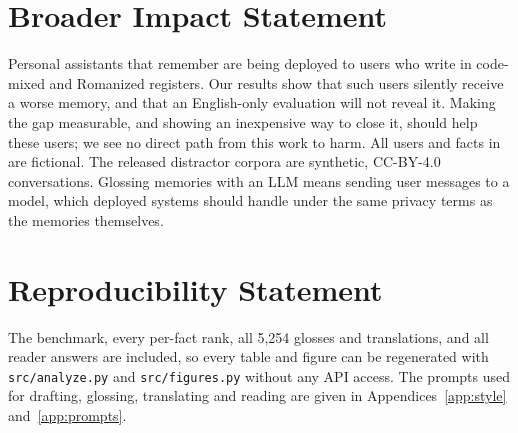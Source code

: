 \section*{Broader Impact Statement}
Personal assistants that remember are being deployed to users who write in code-mixed and Romanized registers. Our results show that such users silently receive a worse memory, and that an English-only evaluation will not reveal it. Making the gap measurable, and showing an inexpensive way to close it, should help these users; we see no direct path from this work to harm. All users and facts in \lipi{} are fictional. The released distractor corpora are synthetic, CC-BY-4.0 conversations. Glossing memories with an LLM means sending user messages to a model, which deployed systems should handle under the same privacy terms as the memories themselves.

\section*{Reproducibility Statement}
\CodeAvailability{} The benchmark, every per-fact rank, all 5{,}254 glosses and translations, and all reader answers are included, so every table and figure can be regenerated with \texttt{src/analyze.py} and \texttt{src/figures.py} without any API access. The prompts used for drafting, glossing, translating and reading are given in Appendices~\ref{app:style} and~\ref{app:prompts}.

